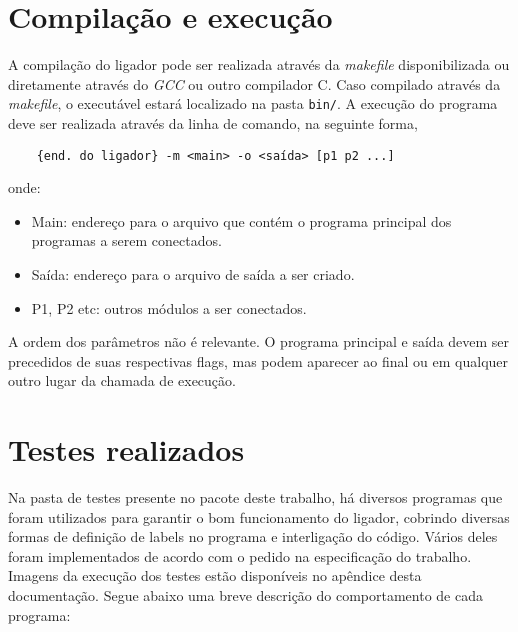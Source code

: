 \documentclass[12pt,a4paper]{article}
\numberwithin{equation}{section}
\begin{document}
\section{Compilação e execução}

A compilação do ligador pode ser realizada através da \emph{makefile} disponibilizada ou diretamente através do \emph{GCC} ou outro compilador C. Caso compilado através da \emph{makefile}, o executável estará localizado na pasta \verb|bin/|. A execução do programa deve ser realizada através da linha de comando, na seguinte forma,

\begin{verbatim}
    {end. do ligador} -m <main> -o <saída> [p1 p2 ...]
\end{verbatim}

onde:

\begin{itemize}
    \item Main: endereço para o arquivo que contém o programa principal dos programas a serem conectados.
    \item Saída: endereço para o arquivo de saída a ser criado.
    \item P1, P2 etc: outros módulos a ser conectados.
\end{itemize}

A ordem dos parâmetros não é relevante. O programa principal e saída devem ser precedidos de suas respectivas flags, mas podem aparecer ao final ou em qualquer outro lugar da chamada de execução.

\section{Testes realizados}

Na pasta de testes presente no pacote deste trabalho, há diversos programas que foram utilizados para garantir o bom funcionamento do ligador, cobrindo diversas formas de definição de labels no programa e interligação do código. Vários deles foram implementados de acordo com o pedido na especificação do trabalho. Imagens da execução dos testes estão disponíveis no apêndice desta documentação. Segue abaixo uma breve descrição do comportamento de cada programa:
\end{document}
